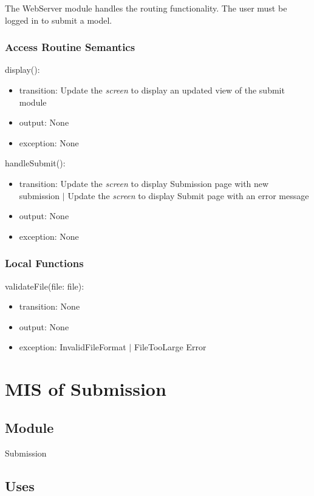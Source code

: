 \documentclass[12pt, titlepage]{article}
\begin{document}
The WebServer module handles the routing functionality.
The user must be logged in to submit a model.

\subsubsection{Access Routine Semantics}

\noindent display():
\begin{itemize}
\item transition: Update the \textit{screen} to display an updated view of the submit module
\item output: None
\item exception: None
\end{itemize}

\noindent handleSubmit():
\begin{itemize}
\item transition: Update the \textit{screen} to display Submission page with new submission $|$ Update the \textit{screen} to display Submit page with an error message
\item output: None
\item exception: None

\end{itemize}

\subsubsection{Local Functions}

\noindent validateFile(file: file):
\begin{itemize}
\item transition: None
\item output: None
\item exception: InvalidFileFormat $|$ FileTooLarge Error
\end{itemize}


\newpage

\section{MIS of Submission} \label{SubmissionModule}

\subsection{Module}

Submission

\subsection{Uses}
\end{document}
